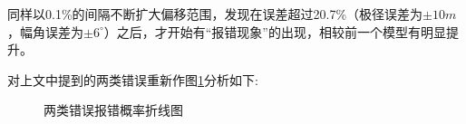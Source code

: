 \documentclass{ctexart}
\begin{document}
  同样以0.1\%的间隔不断扩大偏移范围，发现在误差超过20.7\%（极径误差为$\pm 10m $，幅角误差为$\pm 6^{\circ}$）之后，才开始有“报错现象”的出现，相较前一个模型有明显提升。

  对上文中提到的两类错误重新作图\ref{两类错误报错概率折线图}分析如下:

  \begin{figure}[H]
  \center
  
  \hspace{-20pt}%
  \caption{两类错误报错概率折线图}
  \label{两类错误报错概率折线图}
  \end{figure}
\end{document}
